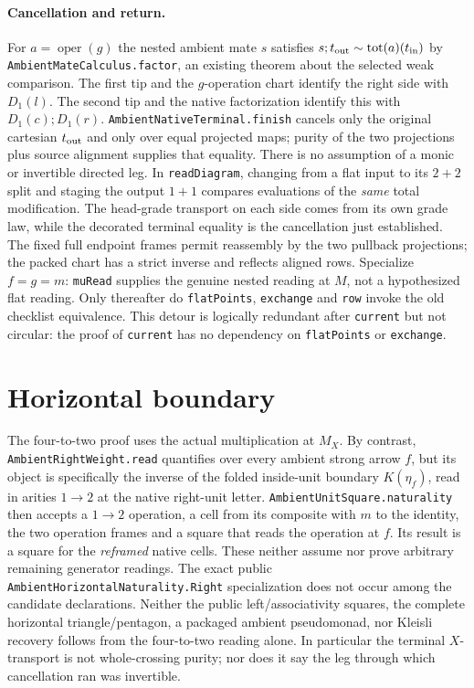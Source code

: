 \documentclass[11pt]{article}
\newcommand{\nm}[1]{\nolinkurl{#1}}
\newcommand{\al}{\mathrel{\sim}}
\begin{document}
\paragraph{Cancellation and return.}
For $a=\operatorname{oper}(g)$ the nested ambient mate $s$ satisfies $s;t_{\rm out}\al\operatorname{tot}(a)(t_{\rm in})$ by \nm{AmbientMateCalculus.factor}, an existing theorem about the selected weak comparison. The first tip and the $g$-operation chart identify the right side with $D_1(l)$. The second tip and the native factorization identify this with $D_1(c);D_1(r)$. \nm{AmbientNativeTerminal.finish} cancels only the original cartesian $t_{\rm out}$ and only over equal projected maps; purity of the two projections plus source alignment supplies that equality. There is no assumption of a monic or invertible directed leg. In \nm{readDiagram}, changing from a flat input to its $2+2$ split and staging the output $1+1$ compares evaluations of the \emph{same} total modification. The head-grade transport on each side comes from its own grade law, while the decorated terminal equality is the cancellation just established. The fixed full endpoint frames permit reassembly by the two pullback projections; the packed chart has a strict inverse and reflects aligned rows. Specialize $f=g=m$: \nm{muRead} supplies the genuine nested reading at $M$, not a hypothesized flat reading. Only thereafter do \nm{flatPoints}, \nm{exchange} and \nm{row} invoke the old checklist equivalence. This detour is logically redundant after \nm{current} but not circular: the proof of \nm{current} has no dependency on \nm{flatPoints} or \nm{exchange}.
\section*{Horizontal boundary}
The four-to-two proof uses the actual multiplication at $M_X$. By contrast, \nm{AmbientRightWeight.read} quantifies over every ambient strong arrow $f$, but its object is specifically the inverse of the folded inside-unit boundary $K(\eta_f)$, read in arities $1\to2$ at the native right-unit letter. \nm{AmbientUnitSquare.naturality} then accepts a $1\to2$ operation, a cell from its composite with $m$ to the identity, the two operation frames and a square that reads the operation at $f$. Its result is a square for the \emph{reframed} native cells. These neither assume nor prove arbitrary remaining generator readings. The exact public \nm{AmbientHorizontalNaturality.Right} specialization does not occur among the candidate declarations. Neither the public left/associativity squares, the complete horizontal triangle/pentagon, a packaged ambient pseudomonad, nor Kleisli recovery follows from the four-to-two reading alone. In particular the terminal $X$-transport is not whole-crossing purity; nor does it say the leg through which cancellation ran was invertible.
\end{document}
